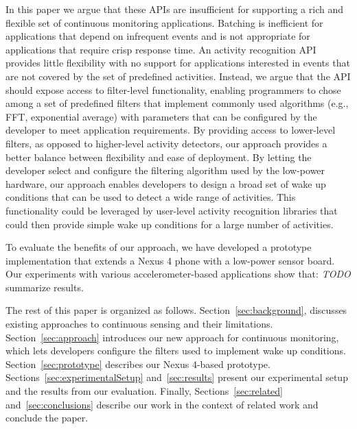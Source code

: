 In this paper we argue that these APIs are insufficient for supporting
a rich and flexible set of continuous monitoring applications.
Batching is inefficient for applications that depend on infrequent
events and is not appropriate for applications that require crisp
response time.  An activity recognition API provides little
flexibility with no support for applications interested in events that
are not covered by the set of predefined activities.  Instead, we
argue that the API should expose access to filter-level functionality,
enabling programmers to chose among a set of predefined filters that
implement commonly used algorithms (e.g., FFT, exponential average)
with parameters that can be configured by the developer to meet
application requirements.  By providing access to lower-level filters,
as opposed to higher-level activity detectors, our approach provides a
better balance between flexibility and ease of deployment.  By letting
the developer select and configure the filtering algorithm used by the
low-power hardware, our approach enables developers to design a broad
set of wake up conditions that can be used to detect a wide range of
activities.  This functionality could be leveraged by user-level
activity recognition libraries that could then provide simple wake up
conditions for a large number of activities.

To evaluate the benefits of our approach, we have developed a prototype
implementation that extends a Nexus 4 phone with a low-power sensor
board.  Our experiments with various accelerometer-based applications
show that: {\em TODO} summarize results.

The rest of this paper is organized as follows.
Section~\ref{sec:background}, discusses existing approaches to
continuous sensing and their limitations.  Section~\ref{sec:approach}
introduces our new approach for continuous monitoring, which lets
developers configure the filters used to implement wake up conditions.
Section~\ref{sec:prototype} describes our Nexus 4-based prototype.
Sections~\ref{sec:experimentalSetup} and~\ref{sec:results} present our
experimental setup and the results from our evaluation.  Finally,
Sections~\ref{sec:related} and~\ref{sec:conclusions} describe our work
in the context of related work and conclude the paper.

